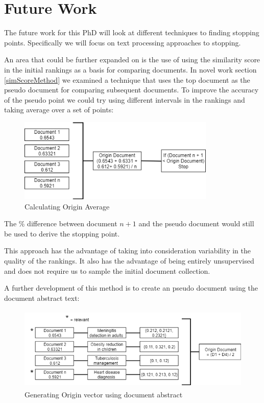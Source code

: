 \chapter{Future Work} \label{fw}

The future work for this PhD will look at different techniques to finding stopping points. Specifically we will focus on text processing approaches to stopping.



An area that could be further expanded on is the use of using the similarity score in the initial rankings as a basis for comparing documents. In novel work section \ref{simScoreMethod} we examined a technique that uses the top document as the pseudo document for comparing subsequent documents. To improve the accuracy of the pseudo point we could try using different intervals in the rankings and taking average over a set of points:


\begin{figure}[H]
\center
\includegraphics[height=4cm]{figures/originMethod.png}
\caption{Calculating Origin Average}
\end{figure}

The \% difference between document $n+1$ and the pseudo document would still be used to derive the stopping point.

This approach has the advantage of taking into consideration variability in the quality of the rankings. It also has the advantage of being entirely unsupervised and does not require us to sample the initial document collection. 

A further development of this method is to create an pseudo document using the document abstract text:

\begin{figure}[H]
\center
\includegraphics[height=4cm]{figures/origin2.png}
\caption{Generating Origin vector using document abstract}
\end{figure}


